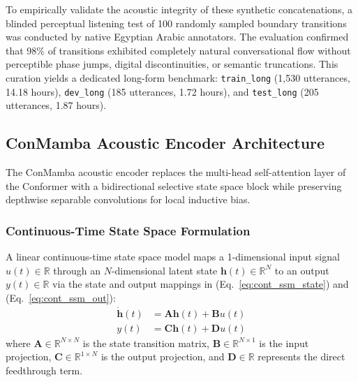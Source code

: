 \documentclass[journal]{IEEEtran}
\begin{document}
To empirically validate the acoustic integrity of these synthetic concatenations, a blinded perceptual listening test of 100 randomly sampled boundary transitions was conducted by native Egyptian Arabic annotators. The evaluation confirmed that 98\% of transitions exhibited completely natural conversational flow without perceptible phase jumps, digital discontinuities, or semantic truncations. This curation yields a dedicated long-form benchmark: \texttt{train\_\allowbreak long} (1,530 utterances, 14.18 hours), \texttt{dev\_\allowbreak long} (185 utterances, 1.72 hours), and \texttt{test\_\allowbreak long} (205 utterances, 1.87 hours).

\subsection{ConMamba Acoustic Encoder Architecture}
The ConMamba acoustic encoder replaces the multi-head self-attention layer of the Conformer with a bidirectional selective state space block while preserving depthwise separable convolutions for local inductive bias.

\subsubsection{Continuous-Time State Space Formulation}
A linear continuous-time state space model maps a 1-dimensional input signal $u(t) \in \mathbb{R}$ through an $N$-dimensional latent state $\mathbf{h}(t) \in \mathbb{R}^N$ to an output $y(t) \in \mathbb{R}$ via the state and output mappings in (Eq.~\ref{eq:cont_ssm_state}) and (Eq.~\ref{eq:cont_ssm_out}):
\begin{align}
\dot{\mathbf{h}}(t) &= \mathbf{A}\mathbf{h}(t) + \mathbf{B}u(t) \label{eq:cont_ssm_state} \\
y(t) &= \mathbf{C}\mathbf{h}(t) + \mathbf{D}u(t) \label{eq:cont_ssm_out}
\end{align}
where $\mathbf{A} \in \mathbb{R}^{N \times N}$ is the state transition matrix, $\mathbf{B} \in \mathbb{R}^{N \times 1}$ is the input projection, $\mathbf{C} \in \mathbb{R}^{1 \times N}$ is the output projection, and $\mathbf{D} \in \mathbb{R}$ represents the direct feedthrough term.
\end{document}
